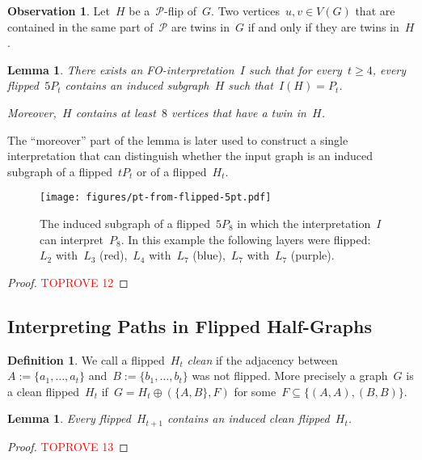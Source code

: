 \documentclass[11pt]{article}      \usepackage[margin=1in]{geometry}  \usepackage{microtype}
\newtheorem{lemma}[theorem]{Lemma}
\theoremstyle{definition}
\newtheorem{definition}[theorem]{Definition}
\newtheorem{observation}[theorem]{Observation}
\newcommand{\PP}{\mathcal{P}}
\renewcommand{\ge}{\geqslant}
\renewcommand{\geq}{\ge}
\begin{document}
\begin{observation}\label{obs:twin-flip}
    Let~$H$ be a~$\PP$-flip of~$G$. Two vertices~$u,v \in V(G)$ that are contained in the same part of~$\PP$ are twins in~$G$ if and only if they are twins in~$H$.
\end{observation}





\begin{lemma}\label{lem:paths-from-swimlanes}
    There exists an FO-interpretation~$I$ such that for every~$t\geq 4$, every flipped~$5P_t$ contains an induced subgraph~$H$ such that~$I(H)= P_t$.

    \smallskip\noindent
    Moreover,~$H$ contains at least~$8$ vertices that have a twin in~$H$.
\end{lemma}

The ``moreover'' part of the lemma is later used to construct a single interpretation that can distinguish whether the input graph is an induced subgraph of a flipped~$tP_t$ or of a flipped~$H_t$.

\begin{figure}[htbp]
    \centering
    \texttt{[image: figures/pt-from-flipped-5pt.pdf]}    
    \caption{The induced subgraph of a flipped~$5P_8$ in which the interpretation~$I$ can interpret~$P_8$.
    In this example the following layers were flipped:~$L_2$ with~$L_3$ (red),~$L_4$ with~$L_7$ (blue),~$L_7$ with~$L_7$ (purple).
    }
    \label{fig:pt-from-flipped-5pt}
\end{figure}

\begin{proof}\textcolor{red}{TOPROVE 12}\end{proof}


\subsection{Interpreting Paths in Flipped Half-Graphs}



\begin{definition}
    We call a flipped~$H_t$ \emph{clean} if the adjacency between~$A := \{a_1,\ldots,a_t\}$ and~$B := \{b_1,\ldots,b_t\}$ was not flipped.
    More precisely a graph~$G$ is a clean flipped~$H_t$ if~$G = H_t \oplus (\{A,B\},F)$ for some~$F\subseteq \{(A,A),(B,B)\}$.
\end{definition}

\begin{lemma}\label{lem:clean-flipped}
    Every flipped~$H_{t+1}$ contains an induced clean flipped~$H_{t}$.
\end{lemma}
\begin{proof}\textcolor{red}{TOPROVE 13}\end{proof}
\end{document}
